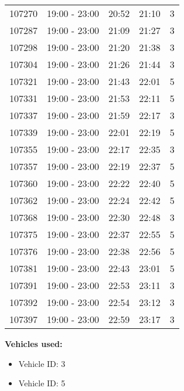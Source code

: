 \documentclass{article}
\begin{document}
\begin{tabular}{llccc}
107270 & 19:00 - 23:00 & 20:52 & 21:10 & 3 \\
107287 & 19:00 - 23:00 & 21:09 & 21:27 & 3 \\
107298 & 19:00 - 23:00 & 21:20 & 21:38 & 3 \\
107304 & 19:00 - 23:00 & 21:26 & 21:44 & 3 \\
107321 & 19:00 - 23:00 & 21:43 & 22:01 & 5 \\
107331 & 19:00 - 23:00 & 21:53 & 22:11 & 5 \\
107337 & 19:00 - 23:00 & 21:59 & 22:17 & 3 \\
107339 & 19:00 - 23:00 & 22:01 & 22:19 & 5 \\
107355 & 19:00 - 23:00 & 22:17 & 22:35 & 3 \\
107357 & 19:00 - 23:00 & 22:19 & 22:37 & 5 \\
107360 & 19:00 - 23:00 & 22:22 & 22:40 & 5 \\
107362 & 19:00 - 23:00 & 22:24 & 22:42 & 5 \\
107368 & 19:00 - 23:00 & 22:30 & 22:48 & 3 \\
107375 & 19:00 - 23:00 & 22:37 & 22:55 & 5 \\
107376 & 19:00 - 23:00 & 22:38 & 22:56 & 5 \\
107381 & 19:00 - 23:00 & 22:43 & 23:01 & 5 \\
107391 & 19:00 - 23:00 & 22:53 & 23:11 & 3 \\
107392 & 19:00 - 23:00 & 22:54 & 23:12 & 3 \\
107397 & 19:00 - 23:00 & 22:59 & 23:17 & 3 \\
\bottomrule
\end{tabular}

\textbf{Vehicles used:}
\begin{itemize}
  \item Vehicle ID: 3
  \item Vehicle ID: 5
\end{itemize}
\end{document}
